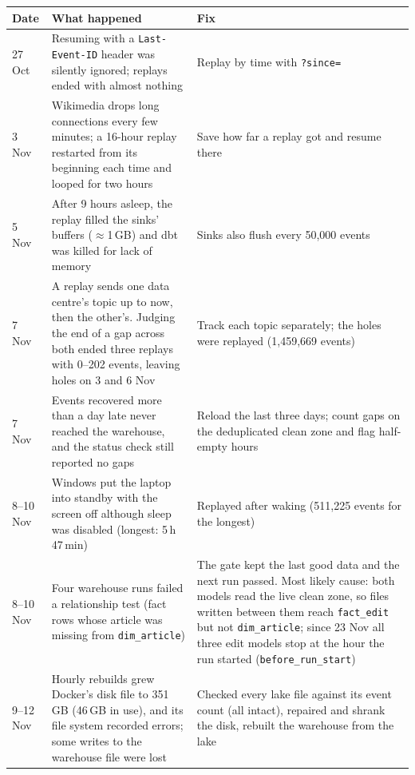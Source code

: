\begin{table}[!h]
  \centering\small
  \begin{tabularx}{\linewidth}{l>{\raggedright\arraybackslash}X>{\raggedright\arraybackslash}X}
    \toprule
    Date & What happened & Fix \\
    \midrule
    27 Oct & Resuming with a \texttt{Last-Event-ID} header was silently ignored; replays ended with
      almost nothing & Replay by time with \texttt{?since=} \\
    3 Nov & Wikimedia drops long connections every few minutes; a 16-hour replay restarted from its
      beginning each time and looped for two hours & Save how far a replay got and resume there \\
    5 Nov & After 9 hours asleep, the replay filled the sinks' buffers ($\approx$1\,GB) and dbt was
      killed for lack of memory & Sinks also flush every 50,000 events \\
    7 Nov & A replay sends one data centre's topic up to now, then the other's. Judging the end of a gap
      across both ended three replays with 0--202 events, leaving holes on 3 and 6 Nov & Track each
      topic separately; the holes were replayed (1,459,669 events) \\
    7 Nov & Events recovered more than a day late never reached the warehouse, and the status check
      still reported no gaps & Reload the last three days; count gaps on the deduplicated clean zone and
      flag half-empty hours \\
    8--10 Nov & Windows put the laptop into standby with the screen off although sleep was disabled
      (longest: 5\,h 47\,min) & Replayed after waking (511,225 events for the longest) \\
    8--10 Nov & Four warehouse runs failed a relationship test (fact rows whose article was missing
      from \texttt{dim\_article}) & The gate kept the last good data and the next run passed. Most likely
      cause: both models read the live clean zone, so files written between them reach
      \texttt{fact\_edit} but not \texttt{dim\_article}; since 23 Nov all three edit models stop
      at the hour the run started (\texttt{before\_run\_start}) \\
    9--12 Nov & Hourly rebuilds grew Docker's disk file to 351\,GB (46\,GB in use), and its file system
      recorded errors; some writes to the warehouse file were lost & Checked every lake file against its
      event count (all intact), repaired and shrank the disk, rebuilt the warehouse from the lake \\

\end{tabularx}
\end{table}
